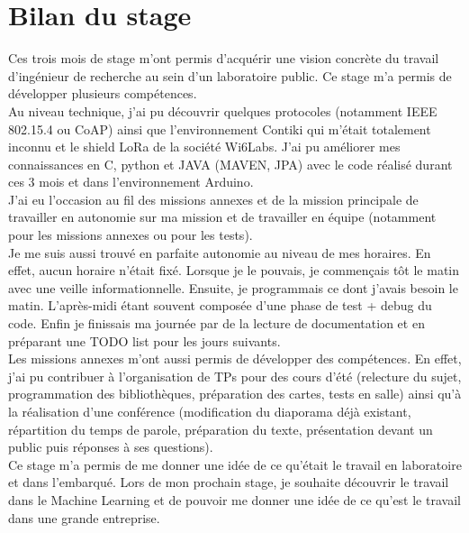 \documentclass{article}
\begin{document}
\section{Bilan du stage}
Ces trois mois de stage m'ont permis d'acquérir une vision concrète du travail d'ingénieur de recherche au sein d'un laboratoire public.
Ce stage m'a permis de développer plusieurs compétences.\\
Au niveau technique, j'ai pu découvrir quelques protocoles (notamment IEEE 802.15.4 ou CoAP) ainsi que l'environnement Contiki qui m'était totalement inconnu et le shield LoRa de la société Wi6Labs. J'ai pu améliorer mes connaissances en C, python et JAVA (MAVEN, JPA) avec le code réalisé durant ces 3 mois et dans l'environnement Arduino.\\
J'ai eu l'occasion au fil des missions annexes et de la mission principale de travailler en autonomie sur ma mission et de travailler en équipe (notamment pour les missions annexes ou pour les tests).\\
Je me suis aussi trouvé en parfaite autonomie au niveau de mes horaires. En effet, aucun horaire n'était fixé. Lorsque je le pouvais, je commençais tôt le matin avec une veille informationnelle. Ensuite, je programmais ce dont j'avais besoin le matin. L'après-midi étant souvent composée d'une phase de test + debug du code. Enfin je finissais ma journée par de la lecture de documentation et en préparant une TODO list pour les jours suivants.\\
Les missions annexes m'ont aussi permis de développer des compétences. En effet, j'ai pu contribuer à l'organisation de TPs pour des cours d'été (relecture du sujet, programmation des bibliothèques, préparation des cartes, tests en salle) ainsi qu'à la réalisation d'une conférence (modification du diaporama déjà existant, répartition du temps de parole, préparation du texte, présentation devant un public puis réponses à ses questions).\\
Ce stage m'a permis de me donner une idée de ce qu'était le travail en laboratoire et dans l'embarqué. Lors de mon prochain stage, je souhaite découvrir le travail dans le Machine Learning et de pouvoir me donner une idée de ce qu'est le travail dans une grande entreprise.
\newpage
\appendix
\end{document}
